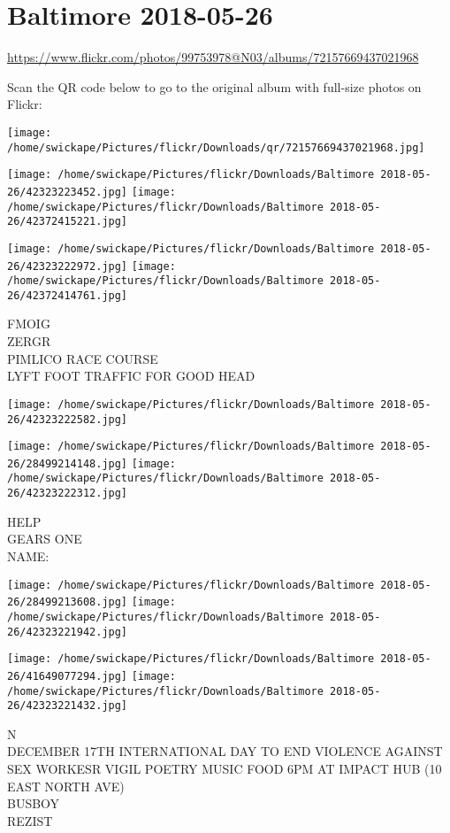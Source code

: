\documentclass[10pt,letterpaper]{article}
\title{}
\author{}
\date{}
\begin{document}
\section*{Baltimore 2018-05-26}

\url{https://www.flickr.com/photos/99753978@N03/albums/72157669437021968}

Scan the QR code below to go to the original album with full-size photos on Flickr:

\texttt{[image: /home/swickape/Pictures/flickr/Downloads/qr/72157669437021968.jpg]}
\pagebreak

\texttt{[image: /home/swickape/Pictures/flickr/Downloads/Baltimore 2018-05-26/42323223452.jpg]}
\texttt{[image: /home/swickape/Pictures/flickr/Downloads/Baltimore 2018-05-26/42372415221.jpg]}

\texttt{[image: /home/swickape/Pictures/flickr/Downloads/Baltimore 2018-05-26/42323222972.jpg]}
\texttt{[image: /home/swickape/Pictures/flickr/Downloads/Baltimore 2018-05-26/42372414761.jpg]}

FMOIG\\
ZERGR\\
PIMLICO RACE COURSE\\
LYFT FOOT TRAFFIC FOR GOOD HEAD
\pagebreak

\texttt{[image: /home/swickape/Pictures/flickr/Downloads/Baltimore 2018-05-26/42323222582.jpg]}

\vspace{0.25in}
\texttt{[image: /home/swickape/Pictures/flickr/Downloads/Baltimore 2018-05-26/28499214148.jpg]}
\texttt{[image: /home/swickape/Pictures/flickr/Downloads/Baltimore 2018-05-26/42323222312.jpg]}

HELP\\
GEARS ONE\\
NAME:
\pagebreak

\texttt{[image: /home/swickape/Pictures/flickr/Downloads/Baltimore 2018-05-26/28499213608.jpg]}
\texttt{[image: /home/swickape/Pictures/flickr/Downloads/Baltimore 2018-05-26/42323221942.jpg]}

\texttt{[image: /home/swickape/Pictures/flickr/Downloads/Baltimore 2018-05-26/41649077294.jpg]}
\texttt{[image: /home/swickape/Pictures/flickr/Downloads/Baltimore 2018-05-26/42323221432.jpg]}

N\\
DECEMBER 17TH INTERNATIONAL DAY TO END VIOLENCE AGAINST SEX WORKESR VIGIL POETRY MUSIC FOOD 6PM AT IMPACT HUB (10 EAST NORTH AVE)\\
BUSBOY\\
REZIST
\pagebreak
\end{document}
